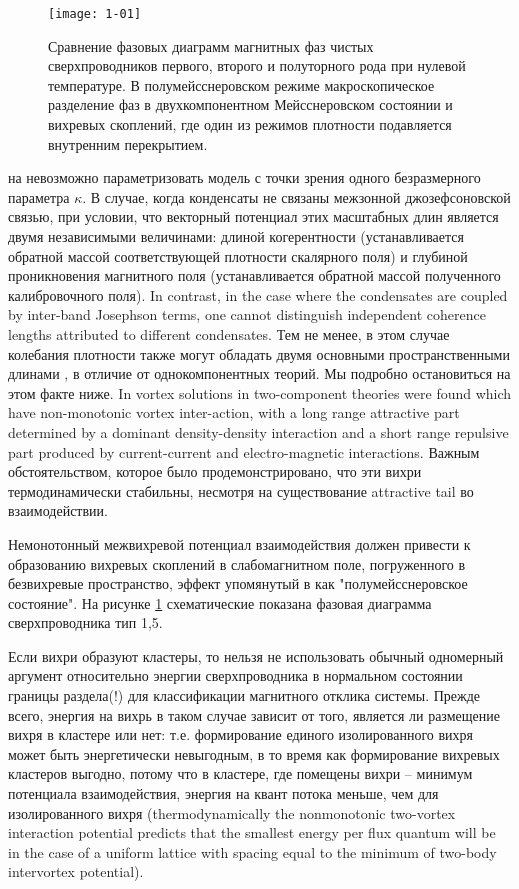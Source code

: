\begin{figure}[h!]
  \texttt{[image: 1-01]}
  \caption{Сравнение фазовых диаграмм магнитных фаз чистых сверхпроводников
    первого, второго и полуторного рода при нулевой температуре. В 
    полумейсснеровском режиме макроскопическое разделение фаз в 
    двухкомпонентном Мейсснеровском состоянии и вихревых скоплений, где один 
    из режимов плотности подавляется внутренним перекрытием.}
  \label{fig:1}
\end{figure}

на невозможно параметризовать модель с точки зрения одного безразмерного 
параметра \( \kappa \). В случае, когда конденсаты не связаны межзонной 
джозефсоновской связью, при условии, что векторный потенциал этих масштабных 
длин является двумя независимыми величинами: длиной когерентности 
(устанавливается обратной массой соответствующей плотности скалярного поля) и 
глубиной проникновения магнитного поля (устанавливается обратной массой 
полученного калибровочного поля). In contrast, in the 
case where the condensates are coupled by inter-band Josephson terms, one 
cannot distinguish independent coherence lengths attributed to different 
condensates. Тем не менее, в этом случае колебания плотности также могут 
обладать двумя основными пространственными длинами \cite{bib:2}, в отличие от 
однокомпонентных теорий. Мы подробно остановиться на этом факте ниже. In 
\cite{bib:1,bib:2} vortex 
solutions in two-component theories were found which have non-monotonic 
vortex inter-action, with a long range attractive part determined by a 
dominant density-density interaction and a short range repulsive part produced 
by current-current and electro-magnetic interactions. Важным обстоятельством, 
которое было продемонстрировано, что эти вихри термодинамически стабильны, 
несмотря на существование attractive tail во взаимодействии.

Немонотонный межвихревой потенциал взаимодействия должен привести к 
образованию вихревых скоплений в слабомагнитном поле, погруженного в 
безвихревые пространство, эффект упомянутый в \cite{bib:1} как 
"полумейсснеровское состояние". На рисунке \ref{fig:1} схематические показана 
фазовая диаграмма сверхпроводника тип 1,5.

Если вихри образуют кластеры, то нельзя не использовать обычный одномерный 
аргумент относительно энергии сверхпроводника в нормальном состоянии границы 
раздела(!) для классификации магнитного отклика системы. Прежде всего, энергия 
на вихрь в таком случае зависит от того, является ли размещение вихря в 
кластере или нет: т.е. формирование единого изолированного вихря может быть 
энергетически невыгодным, в то время как формирование вихревых кластеров 
выгодно, потому что в кластере, где помещены вихри -- минимум потенциала 
взаимодействия, энергия на квант потока меньше, чем для изолированного вихря
(thermodynamically the nonmonotonic two-vortex interaction potential predicts 
that the smallest energy per flux quantum will be in the case of a uniform 
lattice with spacing equal to the minimum of two-body intervortex potential).


